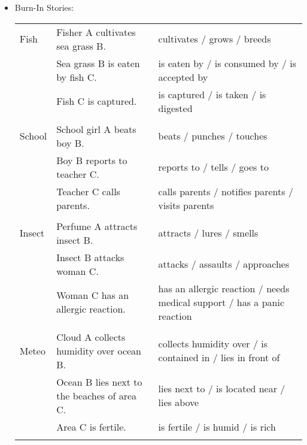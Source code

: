 \begin{itemize}
\begin{longtable}{p{}p{}p{}}
\end{longtable}
\item \normalsize Burn-In Stories:
\scriptsize
\begin{longtable}{p{}p{}p{}}
Fish & Fisher A cultivates sea grass B. & cultivates / grows / breeds \\   & Sea grass B is eaten by fish C. & is eaten by / is consumed by / is accepted by \\   & Fish C is captured. & is captured / is taken / is digested \\  & & \\ School & School girl A beats boy B. & beats / punches / touches \\   & Boy B reports to teacher C. & reports to / tells / goes to \\   & Teacher C calls parents. & calls parents / notifies parents / visits parents \\  & & \\ Insect & Perfume A attracts insect B. & attracts / lures / smells \\   & Insect B attacks woman C. & attacks / assaults / approaches \\   & Woman C has an allergic reaction. & has an allergic reaction / needs medical support / has a panic reaction \\  & & \\ Meteo & Cloud A collects humidity over ocean B. & collects humidity over / is contained in / lies in front of \\   & Ocean B lies next to the beaches of area C. & lies next to / is located near / lies above \\   & Area C is fertile. & is fertile / is humid / is rich \\  & & \\
\end{longtable}
\end{itemize}
